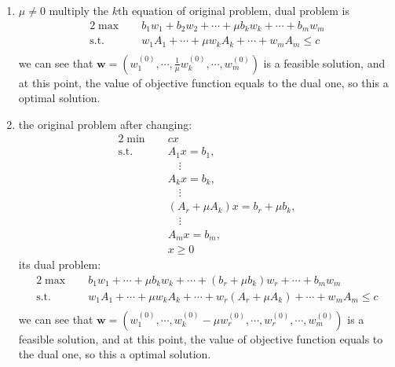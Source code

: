 \documentclass[paper=a4, fontsize=11pt]{scrartcl} %
\numberwithin{equation}{section} %
\numberwithin{figure}{section} %
\numberwithin{table}{section} %
\begin{document}
\begin{enumerate}
\item $\mu\neq0$ multiply the $k$th equation of original problem, dual problem is
\begin{alignat}{2}          \nonumber
\max\quad & b_1w_1+b_2w_2+\cdots+\mu b_kw_k+\cdots+b_mw_m \\    \nonumber
\mbox{s.t.}\quad            \nonumber
& w_1A_1+\cdots+\mu w_kA_k+\cdots+w_mA_m\leq c\\        \nonumber
\end{alignat}
we can see that $\mathbf{w}=(w_1^{(0)},\cdots,\frac{1}{\mu}w_k^{(0)},\cdots,w_m^{(0)})$ is a feasible solution, and at this point, the value of objective function equals to the dual one, so this a optimal solution.
\item the original problem after changing:
\begin{alignat}{2}          \nonumber
\min\quad & cx \\    \nonumber
\mbox{s.t.}\quad            \nonumber
& A_1x=b_1,\\        \nonumber
& \quad\vdots\\           \nonumber
& A_kx=b_k,\\        \nonumber
& \quad\vdots\\           \nonumber
& (A_r+\mu A_k)x=b_r+\mu b_k,\\        \nonumber
& \quad\vdots\\           \nonumber
& A_mx = b_m,\\        \nonumber
& x \geq 0
\end{alignat}
its dual problem:
\begin{alignat}{2}          \nonumber
\max\quad & b_1w_1+\cdots+\mu b_kw_k+\cdots+(b_r+\mu b_k)w_r+\cdots+b_mw_m \\    \nonumber
\mbox{s.t.}\quad            \nonumber
& w_1A_1+\cdots+\mu w_kA_k+\cdots+w_r(A_r+\mu A_k)+\cdots+w_mA_m\leq c\\        \nonumber
\end{alignat}
we can see that $\mathbf{w}=(w_1^{(0)},\cdots,w_k^{(0)}-\mu w_r^{(0)},\cdots,w_r^{(0)},\cdots,w_m^{(0)})$ is a feasible solution, and at this point, the value of objective function equals to the dual one, so this a optimal solution.
\end{enumerate}
\end{document}
